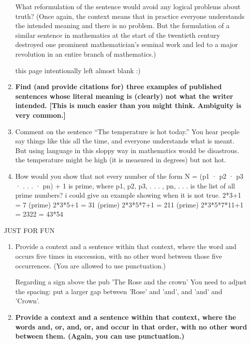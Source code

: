 \documentclass[12pt, letterpaper]{article}
\begin{document}
\begin{enumerate}
What reformulation of the sentence would avoid any logical problems about truth? (Once again,
the context means that in practice everyone understands the intended meaning and there is no
problem. But the formulation of a similar sentence in mathematics at the start of the twentieth
century destroyed one prominent mathematician’s seminal work and led to a major revolution in
an entire branch of mathematics.)

this page intentionally left almost blank :)


 \item \textbf{Find (and provide citations for) three examples of published sentences whose literal meaning is
(clearly) not what the writer intended. [This is much easier than you might think. Ambiguity is
very common.]}
 \item Comment on the sentence “The temperature is hot today.” You hear people say things like this
all the time, and everyone understands what is meant. But using language in this sloppy way in
mathematics would be disastrous.
the temperature might be high (it is measured in degrees) but not hot.
 \item How would you show that not every number of the form N = (p1 · p2 · p3 · . . . · pn) + 1 is prime,
where p1, p2, p3, . . . , pn, . . . is the list of all prime numbers?
i could give an example showing when it is not true.
2*3+1 = 7 (prime)
2*3*5+1 = 31 (prime)
2*3*5*7+1 = 211 (prime)
2*3*5*7*11+1 = 2322 = 43*54
\end{enumerate}
JUST FOR FUN
\begin{enumerate}
\item Provide a context and a sentence within that context, where the word and occurs five times in
succession, with no other word between those five occurrences. (You are allowed to use punctuation.)

Regarding a sign above the pub 'The Rose and the crown'
You need to adjust the spacing: put a larger gap between 'Rose' and 'and', and 'and' and 'Crown'.

\item \textbf{Provide a context and a sentence within that context, where the words and, or, and, or, and occur
in that order, with no other word between them. (Again, you can use punctuation.)}
\end{enumerate}
\end{document}
